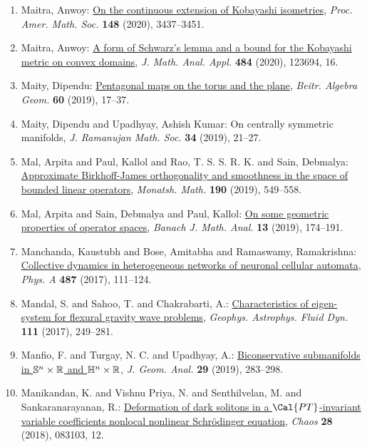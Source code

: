 \begin{enumerate}
\item Maitra, Anwoy: \href{https://doi.org/10.1090/proc/15038}{On the continuous extension of {K}obayashi isometries}, \emph{Proc. Amer. Math. Soc.} {\bf 148} (2020), 3437--3451.
\item Maitra, Anwoy: \href{https://doi.org/10.1016/j.jmaa.2019.123694}{A form of {S}chwarz's lemma and a bound for the {K}obayashi
metric on convex domains}, \emph{J. Math. Anal. Appl.} {\bf 484} (2020), 123694, 16.
\item Maity, Dipendu: \href{https://doi.org/10.1007/s13366-018-0405-7}{Pentagonal maps on the torus and the plane}, \emph{Beitr. Algebra Geom.} {\bf 60} (2019), 17--37.
\item Maity, Dipendu and Upadhyay, Ashish Kumar: On centrally symmetric manifolds, \emph{J. Ramanujan Math. Soc.} {\bf 34} (2019), 21--27.
\item Mal, Arpita and Paul, Kallol and Rao, T. S. S. R. K. and Sain,
Debmalya: \href{https://doi.org/10.1007/s00605-019-01289-3}{Approximate {B}irkhoff-{J}ames orthogonality and smoothness in
the space of bounded linear operators}, \emph{Monatsh. Math.} {\bf 190} (2019), 549--558.
\item Mal, Arpita and Sain, Debmalya and Paul, Kallol: \href{https://doi.org/10.1215/17358787-2018-0021}{On some geometric properties of operator spaces}, \emph{Banach J. Math. Anal.} {\bf 13} (2019), 174--191.
\item Manchanda, Kaustubh and Bose, Amitabha and Ramaswamy,
Ramakrishna: \href{https://doi.org/10.1016/j.physa.2017.06.021}{Collective dynamics in heterogeneous networks of neuronal
cellular automata}, \emph{Phys. A} {\bf 487} (2017), 111--124.
\item Mandal, S. and Sahoo, T. and Chakrabarti, A.: \href{https://doi.org/10.1080/03091929.2017.1318129}{Characteristics of eigen-system for flexural gravity wave
problems}, \emph{Geophys. Astrophys. Fluid Dyn.} {\bf 111} (2017), 249--281.
\item Manfio, F. and Turgay, N. C. and Upadhyay, A.: \href{https://doi.org/10.1007/s12220-018-9990-9}{Biconservative submanifolds in {$\Bbb{S}^n\times\Bbb{R}$} and
{$\Bbb{H}^n\times\Bbb{R}$}}, \emph{J. Geom. Anal.} {\bf 29} (2019), 283--298.
\item Manikandan, K. and Vishnu Priya, N. and Senthilvelan, M. and
Sankaranarayanan, R.: \href{https://doi.org/10.1063/1.5039901}{Deformation of dark solitons in a {$\Cal{PT}$}-invariant
variable coefficients nonlocal nonlinear {S}chr\"{o}dinger
equation}, \emph{Chaos} {\bf 28} (2018), 083103, 12.

\end{enumerate}
